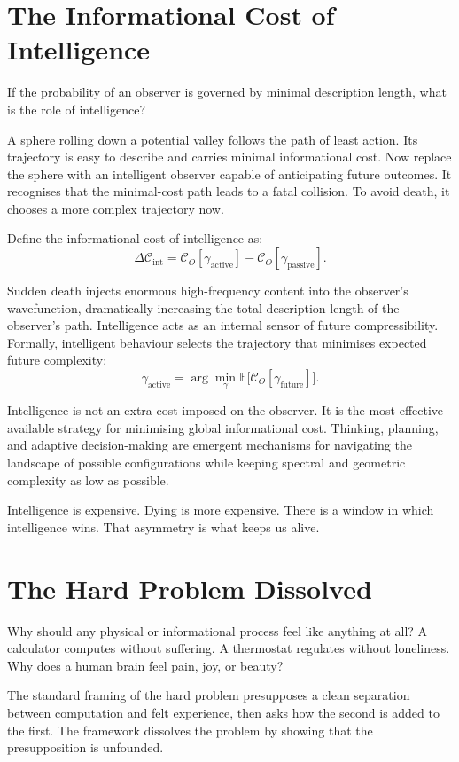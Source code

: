 \section{The Informational Cost of Intelligence}

If the probability of an observer is governed by minimal description
length, what is the role of intelligence?

A sphere rolling down a potential valley follows the path of least
action. Its trajectory is easy to describe and carries minimal
informational cost. Now replace the sphere with an intelligent observer
capable of anticipating future outcomes. It recognises that the
minimal-cost path leads to a fatal collision. To avoid death, it
chooses a more complex trajectory now.

Define the informational cost of intelligence as:
\[
\Delta\mathcal{C}_{\mathrm{int}}
= \mathcal{C}_O[\gamma_{\mathrm{active}}]
- \mathcal{C}_O[\gamma_{\mathrm{passive}}].
\]

Sudden death injects enormous high-frequency content into the observer's
wavefunction, dramatically increasing the total description length of
the observer's path. Intelligence acts as an internal sensor of future
compressibility. Formally, intelligent behaviour selects the trajectory
that minimises expected future complexity:
\[
\gamma_{\mathrm{active}}
= \arg\min_\gamma \mathbb{E}\bigl[\mathcal{C}_O[\gamma_{\mathrm{future}}]\bigr].
\]

Intelligence is not an extra cost imposed on the observer. It is the
most effective available strategy for minimising global informational
cost. Thinking, planning, and adaptive decision-making are emergent
mechanisms for navigating the landscape of possible configurations while
keeping spectral and geometric complexity as low as possible.

Intelligence is expensive. Dying is more expensive. There is a window
in which intelligence wins. That asymmetry is what keeps us alive.


\section{The Hard Problem Dissolved}

Why should any physical or informational process feel like anything at
all? A calculator computes without suffering. A thermostat regulates
without loneliness. Why does a human brain feel pain, joy, or beauty?

The standard framing of the hard problem presupposes a clean separation
between computation and felt experience, then asks how the second is
added to the first. The framework dissolves the problem by showing that
the presupposition is unfounded.

